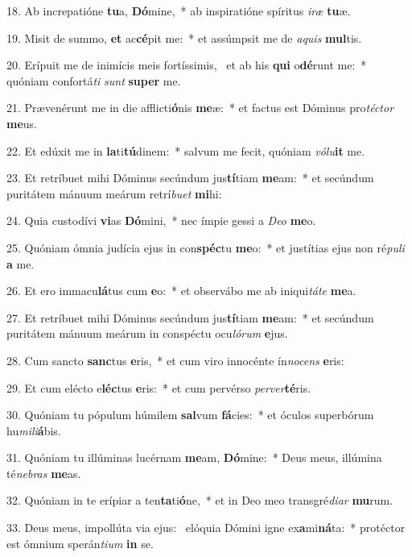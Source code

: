 18. Ab increpatióne \textbf{tu}a, \textbf{Dó}mine,~*  ab inspiratióne spíritus \textit{i}\textit{ræ} \textbf{tu}æ.\

19. Misit de summo, \textbf{et} ac\textbf{cé}pit me:~*  et assúmpsit me de \textit{a}\textit{quis} \textbf{mul}tis.\

20. Erípuit me de inimícis meis fortíssimis, \dag\  et ab his \textbf{qui} o\textbf{dé}runt me:~*  quóniam confortá\textit{ti} \textit{sunt} \textbf{su}\textbf{per} me.\

21. Prævenérunt me in die afflicti\textbf{ó}nis \textbf{me}æ:~*  et factus est Dóminus pro\textit{téc}\textit{tor} \textbf{me}us.\

22. Et edúxit me in \textbf{la}ti\textbf{tú}dinem:~*  salvum me fecit, quóniam \textit{vó}\textit{lu}\textbf{it} me.\

23. Et retríbuet mihi Dóminus secúndum jus\textbf{tí}tiam \textbf{me}am:~*  et secúndum puritátem mánuum meárum retrí\textit{bu}\textit{et} \textbf{mi}hi:\

24. Quia custodívi \textbf{vi}as \textbf{Dó}mini,~*  nec ímpie gessi a \textit{De}\textit{o} \textbf{me}o.\

25. Quóniam ómnia judícia ejus in con\textbf{spéc}tu \textbf{me}o:~*  et justítias ejus non ré\textit{pu}\textit{li} \textbf{a} me.\

26. Et ero immacu\textbf{lá}tus cum \textbf{e}o:~*  et observábo me ab iniqui\textit{tá}\textit{te} \textbf{me}a.\

27. Et retríbuet mihi Dóminus secúndum jus\textbf{tí}tiam \textbf{me}am:~*  et secúndum puritátem mánuum meárum in conspéctu ocu\textit{ló}\textit{rum} \textbf{e}jus.\

28. Cum sancto \textbf{sanc}tus \textbf{e}ris,~*  et cum viro innocénte ín\textit{no}\textit{cens} \textbf{e}ris:\

29. Et cum elécto e\textbf{léc}tus \textbf{e}ris:~*  et cum pervérso \textit{per}\textit{ver}\textbf{té}ris.\

30. Quóniam tu pópulum húmilem \textbf{sal}vum \textbf{fá}cies:~*  et óculos superbórum hu\textit{mi}\textit{li}\textbf{á}bis.\

31. Quóniam tu illúminas lucérnam \textbf{me}am, \textbf{Dó}mine:~*  Deus meus, illúmina té\textit{ne}\textit{bras} \textbf{me}as.\

32. Quóniam in te erípiar a ten\textbf{ta}ti\textbf{ó}ne,~*  et in Deo meo transgré\textit{di}\textit{ar} \textbf{mu}rum.\

33. Deus meus, impollúta via ejus: \dag\  elóquia Dómini igne ex\textbf{a}mi\textbf{ná}ta:~*  protéctor est ómnium sperán\textit{ti}\textit{um} \textbf{in} se.\

